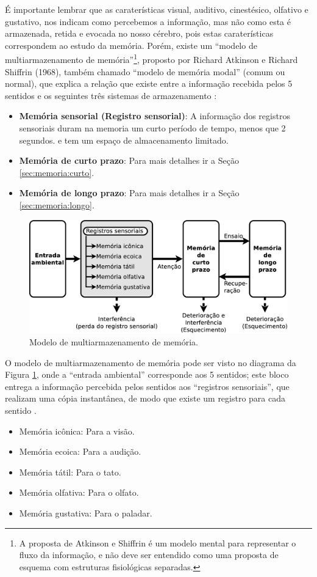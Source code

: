 É importante lembrar que as caraterísticas visual, auditivo, cinestésico, olfativo e gustativo,
nos indicam como percebemos a informação, mas não como esta é armazenada, retida e evocada no nosso cérebro,
pois estas caraterísticas correspondem ao estudo da memória.  
Porém, existe um ``modelo de multiarmazenamento de memória''\footnote{A 
proposta de Atkinson e Shiffrin é um modelo mental para representar o fluxo da informação, 
e não deve ser entendido como uma proposta de esquema com estruturas fisiológicas separadas.}, 
proposto por Richard Atkinson e Richard Shiffrin (1968),
também chamado ``modelo de memória modal'' (comum ou normal),
que explica a relação que existe entre a informação recebida pelos 5 sentidos 
e os seguintes três sistemas de armazenamento  
\cite{10.2307/24922803} \cite[pp. 158]{sternbergpsicologia} \cite[pp. 32]{de2000comprension} \cite{pake2019psicologia}:
\begin{itemize} 
\item \textbf{Memória sensorial (Registro sensorial)}: A informação dos registros sensoriais duram na memoria um curto período de tempo, menos que 2 segundos.
e tem um espaço de almacenamento limitado.
\item \textbf{Memória de curto prazo}: Para mais detalhes ir a Seção \ref{sec:memoria:curto}.
\item \textbf{Memória de longo prazo}: Para mais detalhes ir a Seção \ref{sec:memoria:longo}.
\end{itemize}

\begin{figure}[!h]
  \centering
    \includegraphics[width=\textwidth]{chapters/cap-learning/sentidos-memoria.eps} 
  \caption{Modelo de multiarmazenamento de memória.}
\label{fig:sentidos-memoria}
\end{figure}
O modelo de multiarmazenamento de memória pode ser visto no diagrama da Figura \ref{fig:sentidos-memoria},
onde a ``entrada ambiental'' corresponde aos 5 sentidos;
este bloco entrega a informação percebida pelos sentidos aos ``registros sensoriais'', 
que realizam uma cópia instantânea,
de modo que existe um registro para cada sentido \cite[pp. 158-159]{sternbergpsicologia}  \cite{pake2019psicologia}.
\begin{itemize}
\item Memória icônica: Para a visão.
\item Memória ecoica: Para a audição.
\item Memória tátil: Para o tato.
\item Memória olfativa: Para o olfato.
\item Memória gustativa: Para o paladar.
\end{itemize} 

